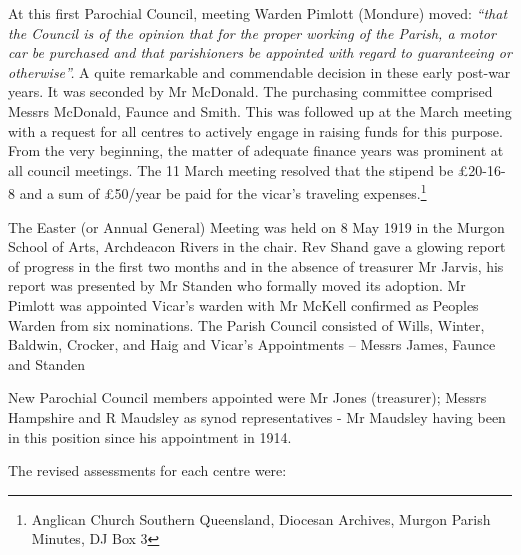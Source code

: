 At this first Parochial Council, meeting Warden Pimlott (Mondure) moved: \emph{``that the Council is of the opinion that for the proper working of the Parish, a motor car be purchased and that parishioners be appointed with regard to guaranteeing or otherwise''.} A quite remarkable and commendable decision in these early post-war years. It was seconded by Mr McDonald. The purchasing committee comprised Messrs McDonald, Faunce and Smith. This was followed up at the March meeting with a request for all centres to actively engage in raising funds for this purpose. From the very beginning, the matter of adequate finance years was prominent at all council meetings. The 11 March meeting resolved that the stipend be \pounds20-16-8 and a sum of \pounds50/year be paid for the vicar's traveling expenses.\footnote{Anglican Church Southern Queensland, Diocesan Archives, Murgon Parish Minutes, DJ Box 3}


The Easter (or Annual General) Meeting was held on 8 May 1919 in the Murgon School of Arts, Archdeacon Rivers in the chair. Rev Shand gave a glowing report of progress in the first two months and in the absence of treasurer Mr Jarvis, his report was presented by Mr Standen who formally moved its adoption. Mr Pimlott was appointed Vicar's warden with Mr McKell confirmed as Peoples Warden from six nominations. The Parish Council consisted of Wills, Winter, Baldwin, Crocker, and Haig and Vicar's Appointments -- Messrs James, Faunce and Standen



New Parochial Council members appointed were Mr Jones (treasurer); Messrs Hampshire and R Maudsley as synod representatives - Mr Maudsley having been in this position since his appointment in 1914.



The revised assessments for each centre were:



